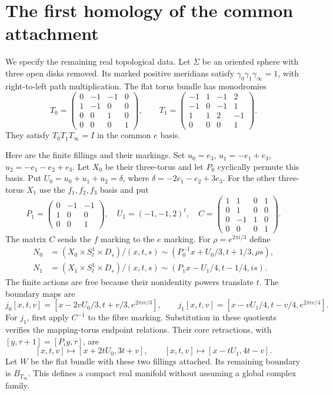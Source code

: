 \section{The first homology of the common attachment}

We specify the remaining real topological data.
Let $\Sigma$ be an oriented sphere with three open disks removed.
Its marked positive meridians satisfy $\gamma_0\gamma_1\gamma_\infty=1$,
with right-to-left path multiplication. The flat torus bundle has monodromies
\[
T_0=\begin{pmatrix}0&-1&-1&0\\1&-1&0&0\\0&0&1&0\\0&0&0&1\end{pmatrix},\qquad
T_1=\begin{pmatrix}-1&1&-1&2\\-1&0&-1&1\\1&1&2&-1\\0&0&0&1\end{pmatrix}.
\]
They satisfy $T_0T_1T_\infty=I$ in the common $e$ basis.

Here are the finite fillings and their markings.
Set $u_0=e_3$, $u_1=-e_1+e_3$, $u_2=-e_1-e_2+e_3$.
Let $X_0$ be their three-torus and let $P_0$ cyclically permute this basis.
Put $U_0=u_0+u_1+u_2=\delta$, where $\delta=-2e_1-e_2+3e_3$.
For the other three-torus $X_1$ use the $f_1,f_2,f_3$ basis and put
\[
P_1=\begin{pmatrix}0&-1&-1\\1&0&0\\0&0&1\end{pmatrix},\quad
U_1=(-1,-1,2)^t,\quad
C=\begin{pmatrix}1&1&0&1\\0&1&0&0\\0&-1&1&0\\0&0&0&1\end{pmatrix}.
\]
The matrix $C$ sends the $f$ marking to the $e$ marking.
For $\rho=e^{2\pi i/3}$ define
\[
\begin{aligned}
N_0&=(X_0\times S^1_t\times D_s)/
 (x,t,s)\sim(P_0^{-1}x+U_0/3,t+1/3,\rho s),\\
N_1&=(X_1\times S^1_t\times D_s)/
 (x,t,s)\sim(P_1x-U_1/4,t-1/4,is).
\end{aligned}
\]
The finite actions are free because their nonidentity powers translate $t$.
The boundary maps are
\[
j_0[x,t,v]=[x-2vU_0/3,t+v/3,e^{2\pi iv/3}],\qquad
j_1[x,t,v]=[x-vU_1/4,t-v/4,e^{2\pi iv/4}].
\]
For $j_1$, first apply $C^{-1}$ to the fibre marking.
Substitution in these quotients verifies the mapping-torus endpoint relations.
Their core retractions, with $[y,\tau+1]=[P_i y,\tau]$, are
\[
[x,t,v]\longmapsto[x+2tU_0,3t+v],\qquad
[x,t,v]\longmapsto[x-tU_1,4t-v].
\]
Let $W$ be the flat bundle with these two fillings attached.
Its remaining boundary is $B_{T_\infty}$.
This defines a compact real manifold without assuming a global complex family.

